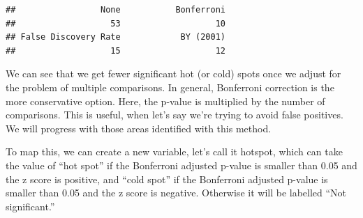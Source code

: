 \documentclass[
  krantz2]{krantz}
\makeatletter
\newenvironment{Shaded}{\begin{snugshade}}{\end{snugshade}}
\newcommand{\AttributeTok}[1]{\textcolor[rgb]{0.61,0.61,0.61}{#1}}
\newcommand{\ConstantTok}[1]{\textcolor[rgb]{0,0,0}{#1}}
\newcommand{\ControlFlowTok}[1]{\textcolor[rgb]{0.27,0.27,0.27}{\textbf{#1}}}
\newcommand{\DecValTok}[1]{\textcolor[rgb]{0.06,0.06,0.06}{#1}}
\newcommand{\FloatTok}[1]{\textcolor[rgb]{0.06,0.06,0.06}{#1}}
\newcommand{\FunctionTok}[1]{\textcolor[rgb]{0,0,0}{#1}}
\newcommand{\NormalTok}[1]{#1}
\newcommand{\OtherTok}[1]{\textcolor[rgb]{0.37,0.37,0.37}{#1}}
\newcommand{\SpecialCharTok}[1]{\textcolor[rgb]{0,0,0}{#1}}
\newcommand{\StringTok}[1]{\textcolor[rgb]{0.5,0.5,0.5}{#1}}
\newenvironment{kframe}{%
\medskip{}
\setlength{\fboxsep}{.8em}
 \def\at@end@of@kframe{}%
 \ifinner\ifhmode%
  \def\at@end@of@kframe{\end{minipage}}%
  \begin{minipage}{\columnwidth}%
 \fi\fi%
 \def\FrameCommand##1{\hskip\@totalleftmargin \hskip-\fboxsep
 \colorbox{shadecolor}{##1}\hskip-\fboxsep
     \hskip-\linewidth \hskip-\@totalleftmargin \hskip\columnwidth}%
 \MakeFramed {\advance\hsize-\width
   \@totalleftmargin\z@ \linewidth\hsize
   \@setminipage}}%
 {\par\unskip\endMakeFramed%
 \at@end@of@kframe}
\renewenvironment{Shaded}{\begin{kframe}}{\end{kframe}}
\makeatother
\begin{document}
\begin{Shaded}
\end{Shaded}

\begin{verbatim}
##                 None           Bonferroni 
##                   53                   10 
## False Discovery Rate            BY (2001) 
##                   15                   12
\end{verbatim}

We can see that we get fewer significant hot (or cold) spots once we adjust for the problem of multiple comparisons. In general, Bonferroni correction is the more conservative option. Here, the p-value is multiplied by the number of comparisons. This is useful, when let's say we're trying to avoid false positives. We will progress with those areas identified with this method.

To map this, we can create a new variable, let's call it hotspot, which can take the value of ``hot spot'' if the Bonferroni adjusted p-value is smaller than 0.05 and the z score is positive, and ``cold spot'' if the Bonferroni adjusted p-value is smaller than 0.05 and the z score is negative. Otherwise it will be labelled ``Not significant.''
\end{document}
